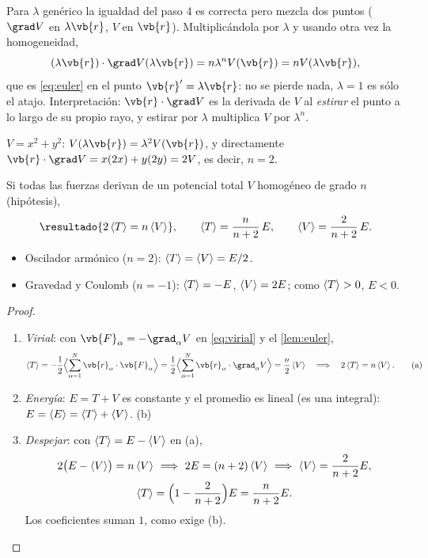 \begin{observacion}[Por qué $\lambda=1$]
Para $\lambda$ genérico la igualdad del paso 4 es correcta pero mezcla dos puntos
($\grad V$ en $\lambda\vb{r}$, $V$ en $\vb{r}$). Multiplicándola por $\lambda$ y usando otra vez la homogeneidad,
\[
  (\lambda\vb{r})\cdot\grad V(\lambda\vb{r})=n\lambda^{n}V(\vb{r})=nV(\lambda\vb{r}),
\]
que es \eqref{eq:euler} en el punto $\vb{r}'=\lambda\vb{r}$: no se pierde nada, $\lambda=1$ es sólo el atajo.
Interpretación: $\vb{r}\cdot\grad V$ es la derivada de $V$ al \emph{estirar} el punto a lo largo de su
propio rayo, y estirar por $\lambda$ multiplica $V$ por $\lambda^{n}$.
\end{observacion}

\begin{ejemplo}
$V=x^{2}+y^{2}$: $V(\lambda\vb{r})=\lambda^{2}V(\vb{r})$, y directamente
$\vb{r}\cdot\grad V=x(2x)+y(2y)=2V$, es decir, $n=2$.
\end{ejemplo}

\begin{corolario}
\label{cor:virial-potencia}
Si todas las fuerzas derivan de un potencial total $V$ homogéneo de grado $n$ (hipótesis),
\begin{equation}
  \resultado{2\prom{T}=n\prom{V}},
  \qquad \prom{T}=\frac{n}{n+2}\,E,\qquad \prom{V}=\frac{2}{n+2}\,E .
  \label{eq:virial-n}
\end{equation}
\begin{itemize}
  \item Oscilador armónico ($n=2$): $\left\langle T\right\rangle=\left\langle V\right\rangle=E/2$.
  \item Gravedad y Coulomb ($n=-1$): $\left\langle T\right\rangle=-E$, $\left\langle V\right\rangle=2E$; como $\left\langle T\right\rangle>0$, $E<0$.
\end{itemize}
\end{corolario}

\begin{proof}
\begin{enumerate}
  \item \emph{Virial}: con $\vb{F}_{\alpha}=-\grad_{\alpha}V$ en \eqref{eq:virial} y el \cref{lem:euler},
  \[
    \prom{T}=-\frac12\Bigl\langle\sa\vb{r}_{\alpha}\cdot\vb{F}_{\alpha}\Bigr\rangle
    =\frac12\Bigl\langle\sa\vb{r}_{\alpha}\cdot\grad_{\alpha}V\Bigr\rangle=\frac n2\prom{V}
    \quad\Longrightarrow\quad 2\prom{T}=n\prom{V}. \tag{a}
  \]
  \item \emph{Energía}: $E=T+V$ es constante y el promedio es lineal (es una integral):
  $E=\left\langle E\right\rangle=\left\langle T\right\rangle+\left\langle V\right\rangle$. \hfill(b)
  \item \emph{Despejar}: con $\left\langle T\right\rangle=E-\left\langle V\right\rangle$ en (a),
  \begin{gather*}
    2\bigl(E-\prom{V}\bigr)=n\prom{V}\ \Longrightarrow\ 2E=(n+2)\prom{V}\ \Longrightarrow\ \prom{V}=\frac{2}{n+2}E,\\
    \prom{T}=\Bigl(1-\frac{2}{n+2}\Bigr)E=\frac{n}{n+2}E .
  \end{gather*}
  Los coeficientes suman $1$, como exige (b).\qedhere
\end{enumerate}
\end{proof}

